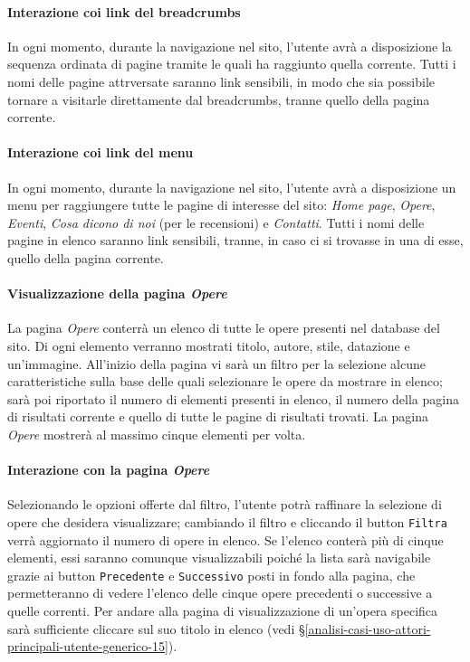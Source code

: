 \paragraph{Interazione coi link del breadcrumbs}
\label{analisi-casi-uso-attori-principali-utente-generico-2}
In ogni momento, durante la navigazione nel sito, l'utente avrà a disposizione la sequenza ordinata di pagine tramite le quali ha raggiunto quella corrente. Tutti i nomi delle pagine attrversate saranno link sensibili, in modo che sia possibile tornare a visitarle direttamente dal breadcrumbs, tranne quello della pagina corrente.


\paragraph{Interazione coi link del menu}
\label{analisi-casi-uso-attori-principali-utente-generico-3}
In ogni momento, durante la navigazione nel sito, l'utente avrà a disposizione un menu per raggiungere tutte le pagine di interesse del sito: \textit{Home page}, \textit{Opere}, \textit{Eventi}, \textit{Cosa dicono di noi} (per le recensioni) e \textit{Contatti}. Tutti i nomi delle pagine in elenco saranno link sensibili, tranne, in caso ci si trovasse in una di esse, quello della pagina corrente.


\paragraph{Visualizzazione della pagina \textit{Opere}}
\label{analisi-casi-uso-attori-principali-utente-generico-4}
La pagina \textit{Opere} conterrà un elenco di tutte le opere presenti nel database del sito. Di ogni elemento verranno mostrati titolo, autore, stile, datazione e un'immagine. All'inizio della pagina vi sarà un filtro per la selezione alcune caratteristiche sulla base delle quali selezionare le opere da mostrare in elenco; sarà poi riportato il numero di elementi presenti in elenco, il numero della pagina di risultati corrente e quello di tutte le pagine di risultati trovati. La pagina \textit{Opere} mostrerà al massimo cinque elementi per volta.


\paragraph{Interazione con la pagina \textit{Opere}}
\label{analisi-casi-uso-attori-principali-utente-generico-5}
Selezionando le opzioni offerte dal filtro, l'utente potrà raffinare la selezione di opere che desidera visualizzare; cambiando il filtro e cliccando il button \texttt{Filtra} verrà aggiornato il numero di opere in elenco. Se l'elenco conterà più di cinque elementi, essi saranno comunque visualizzabili poiché la lista sarà navigabile grazie ai button \texttt{Precedente} e \texttt{Successivo} posti in fondo alla pagina, che permetteranno di vedere l'elenco delle cinque opere precedenti o successive a quelle correnti. Per andare alla pagina di visualizzazione di un'opera specifica sarà sufficiente cliccare sul suo titolo in elenco (vedi §\ref{analisi-casi-uso-attori-principali-utente-generico-15}).


